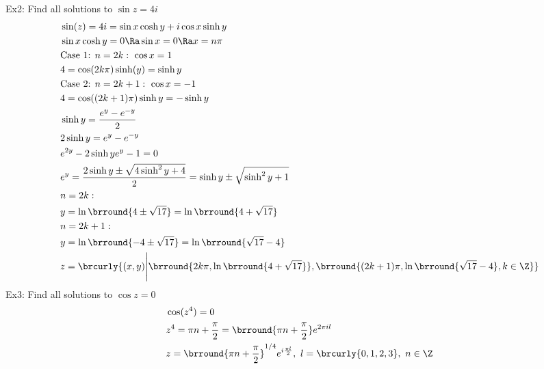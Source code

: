 Ex2: Find all solutions to $\sin z=4i$
\begin{align*}
    &\sin(z)=4i=\sin x\cosh y+i\cos x\sinh y\\
    &\sin x\cosh y=0\Ra \sin x=0\Ra x=n\pi\\
    &\text{Case 1: }n=2k:\ \cos x=1\\
    &4=\cos(2k\pi)\sinh(y)=\sinh y\\
    &\text{Case 2: }n=2k+1:\ \cos x=-1\\
    &4=\cos((2k+1)\pi)\sinh y=-\sinh y\\
    &\sinh y=\frac{e^{y}-e^{-y}}{2}\\
    &2\sinh y=e^y-e^{-y}\\
    &e^{2y}-2\sinh y e^{y}-1=0\\
    &e^y=\frac{2\sinh y\pm\sqrt{4\sinh^2y+4}}{2}=\sinh y\pm \sqrt{\sinh^2y+1}\\
    &n=2k:\\
    &y=\ln\brround{4\pm\sqrt{17}}=\ln\brround{4+\sqrt{17}}\\
    &n=2k+1:\\
    &y=\ln\brround{-4\pm\sqrt{17}}=\ln\brround{\sqrt{17}-4}\\
    &z=\brcurly{(x,y)\Bigg\vert\brround{2k\pi,\ln\brround{4+\sqrt{17}}},\brround{(2k+1)\pi,\ln\brround{\sqrt{17}-4},k\in\Z}}
\end{align*}
Ex3: Find all solutions to $\cos z=0$
\begin{align*}
    &\cos(z^4)=0\\
    &z^4=\pi n+\frac{\pi}{2}=\brround{\pi n+\frac{\pi}{2}}e^{2\pi il}\\
    &z=\brround{\pi n+\frac{\pi}{2}}^{1/4}e^{i\frac{\pi l}{2}},\ l=\brcurly{0,1,2,3},\ n\in\Z
\end{align*}

